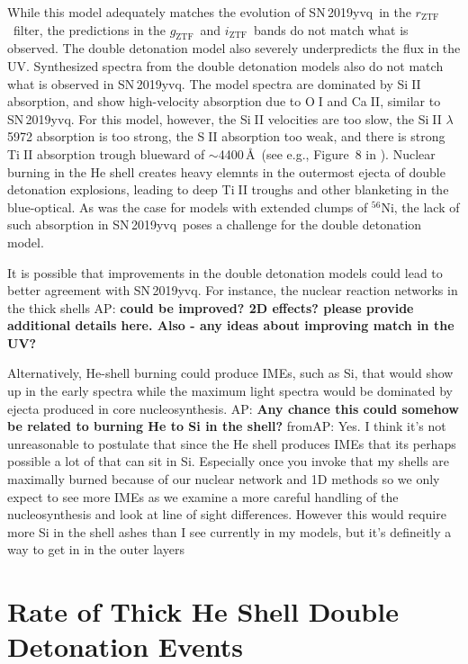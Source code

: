 \documentclass[twocolumn]{aastex63}
\def\ion#1#2{#1$\;${\footnotesize\rm{#2}}\relax}
\newcommand{\abi}[1]{{\color{LincolnGreen} AP: \textbf{#1}}}
\newcommand{\fromabi}[1]{{\color{teal} fromAP: {#1}}}
\newcommand{\rztf}{$r_\mathrm{ZTF}$}
\newcommand{\gztf}{$g_\mathrm{ZTF}$}
\newcommand{\iztf}{$i_\mathrm{ZTF}$}
\newcommand{\radni}{$^{56}$Ni}
\newcommand{\sn}{SN\,2019yvq}
\begin{document}
While this model adequately matches the evolution of \sn\ in the \rztf\
filter, the predictions in the \gztf\ and \iztf\ bands do not match what is
observed. The double detonation model also severely underpredicts the flux in
the UV. Synthesized spectra from the double detonation models also do not
match what is observed in \sn. The model spectra are dominated by
\ion{Si}{II} absorption, and show high-velocity absorption due to \ion{O}{I}
and \ion{Ca}{II}, similar to \sn. For this model, however, the \ion{Si}{II}
velocities are too slow, the \ion{Si}{II} $\lambda$5972 absorption is too
strong, the \ion{S}{II} absorption too weak, and there is strong \ion{Ti}{II}
absorption trough blueward of $\sim$4400\,\AA\ (see e.g., Figure~8 in
\citealt{Polin19}). Nuclear burning in the He shell creates heavy elemnts in
the outermost ejecta of double detonation explosions, leading to deep
\ion{Ti}{II} troughs and other blanketing in the blue-optical. As was the
case for models with extended clumps of \radni, the lack of such absorption
in \sn\ poses a challenge for the double detonation model.

It is possible that improvements in the double detonation models could lead
to better agreement with \sn. For instance, the nuclear reaction networks in
the thick shells \abi{could be improved? 2D effects? please provide
additional details here. Also - any ideas about improving match in the UV?}



Alternatively, He-shell burning could produce IMEs, such as Si, that would
show up in the early spectra while the maximum light spectra would be
dominated by ejecta produced in core nucleosynthesis. \abi{Any chance this
could somehow be related to burning He to Si in the shell?} \fromabi{Yes. I
think it's not unreasonable to postulate that since the He shell produces IMEs
that its perhaps possible a lot of that can sit in Si. Especially once you
invoke that my shells are maximally burned because of our nuclear network and
1D methods so we only expect to see more IMEs as we examine a more careful
handling of the nucleosynthesis and look at line of sight differences. However
this would require more Si in the shell ashes than I see currently in my
models, but it's defineitly a way to get in in the outer layers}


\section{Rate of Thick He Shell Double Detonation Events}\label{sec:rates}
\end{document}
